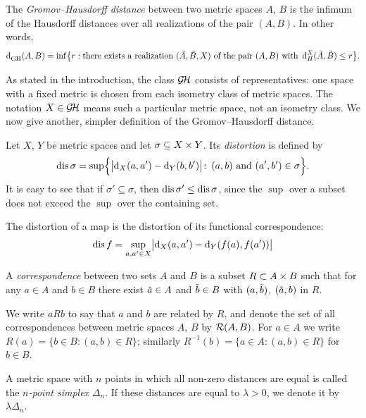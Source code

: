 \begin{define}\label{def: gh-realization}
  The \emph{Gromov--Hausdorff distance} between two metric spaces $A$, $B$ is the infimum of the Hausdorff distances over all realizations of the pair $(A,B)$.
In other words,
  \begin{equation*}
      \operatorname{d}^{}_{\mathrm{GH}}(A,B) = \inf\bigl\{r: \text{there exists a realization } (\tilde{A},\tilde{B},X) \text{ of the pair $(A,B)$ with }\operatorname{d}_{H}^{X} (\tilde{A},\tilde{B}) \leq r \bigr\}.
  \end{equation*}
\end{define}
As stated in the introduction, the class $\operatorname{\mathcal{G\!H}}$ consists of representatives: one space with a fixed metric is chosen from each isometry class of metric spaces. The notation $X \in \operatorname{\mathcal{G\!H}}$ means such a particular metric space, not an isometry class.
We now give another, simpler definition of the Gromov--Hausdorff distance.
\begin{define}
  Let $X$, $Y$ be metric spaces and let $\sigma \subseteq X \times Y$.
Its \emph{distortion} is defined by
  $$
  \operatorname{dis} \sigma = \sup \Bigl\{\bigl|\operatorname{d}_{X}(a,a')-\operatorname{d}_{Y}(b,b')\bigr|\colon\, (a, b) \text{ and } (a', b') \in \sigma \Bigr\}.
  $$
  It is easy to see that if $\sigma'\subseteq\sigma$, then $\operatorname{dis}\sigma'\le\operatorname{dis}\sigma$, since the $\sup$ over a subset does not exceed the $\sup$ over the containing set.
\end{define}
The distortion of a map is the distortion of its functional correspondence:
$$
\operatorname{dis} f = \sup_{a, a' \in X}\bigl|\operatorname{d}_{X}(a,a') - \operatorname{d}_{Y}(f(a), f(a'))\bigr|
$$
\begin{define}
  A \emph{correspondence} between two sets $A$ and $B$ is a subset $R \subset A \times B$ such that for any $a \in A$ and $b \in B$ there exist $\tilde{a} \in A$ and $\tilde{b} \in B$ with $(a,\tilde{b})$, $(\tilde{a}, b)$ in $R$.
\end{define}
We write $aRb$ to say that $a$ and $b$ are related by $R$, and denote the set of all correspondences between metric spaces $A$, $B$ by $\mathcal{R}(A,B)$.
For $a \in A$ we write $R(a) = \{b \in B : (a, b) \in R\}$; similarly $R^{-1}(b) = \{a \in A : (a, b) \in R\}$ for $b \in B$.

\begin{define}\label{def: simplex}
  A metric space with $n$ points in which all non-zero distances are equal is called the \emph{$n$-point simplex} $\Delta_n$. If these distances are equal to $\lambda > 0$, we denote it by $\lambda\Delta_n$.
\end{define}


